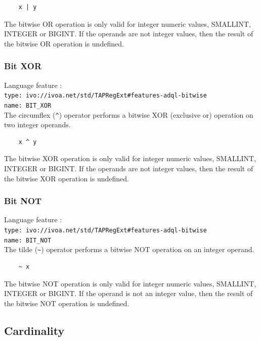 \documentclass[11pt,a4paper]{ivoa}
\begin{document}
\begin{verbatim}
    x | y
\end{verbatim}

The bitwise OR operation is only valid for integer numeric values, 
SMALLINT, INTEGER or BIGINT.
If the operands are not integer values, then the result of the bitwise OR
operation is undefined.

\subsubsection{Bit XOR}
\label{sec:bitwise.xor}
{\footnotesize Language feature :}\\
{\footnotesize \verb|type: ivo://ivoa.net/std/TAPRegExt#features-adql-bitwise|}\\
{\footnotesize \verb|name: BIT_XOR|}\\

The circumflex (\verb:^:) operator performs a bitwise XOR (exclusive or)
operation on two integer operands.

\begin{verbatim}
    x ^ y
\end{verbatim}

The bitwise XOR operation is only valid for integer numeric values, 
SMALLINT, INTEGER or BIGINT.
If the operands are not integer values, then the result of the bitwise
XOR operation is undefined.

\subsubsection{Bit NOT}
\label{sec:bitwise.not}
{\footnotesize Language feature :}\\
{\footnotesize \verb|type: ivo://ivoa.net/std/TAPRegExt#features-adql-bitwise|}\\
{\footnotesize \verb|name: BIT_NOT|}\\

The tilde (\verb:~:) operator performs a bitwise NOT operation on an integer operand.

\begin{verbatim}
    ~ x
\end{verbatim}

The bitwise NOT operation is only valid for integer numeric values, 
SMALLINT, INTEGER or BIGINT.
If the operand is not an integer value, then the result of the bitwise
NOT operation is undefined.

\subsection{Cardinality}
\label{sec:cardinality}
\end{document}
